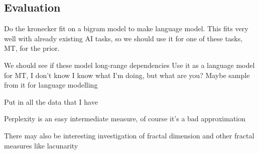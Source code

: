 \documentclass[12pt]{article}
\begin{document}
\subsection{Evaluation}
Do the kronecker fit on a bigram model to make language model. This fits very well with already existing AI tasks, so we should use it for one of these tasks, MT, for the prior.

We should see if these model long-range dependencies
Use it as a language model for MT, I don't know
I know what I'm doing, but what are you?
Maybe sample from it for language modelling

Put in all the data that I have

Perplexity is an easy intermediate measure, of course it's a bad approximation

There may also be interesting investigation of fractal dimension and other fractal measures like lacunarity

\end{document}
